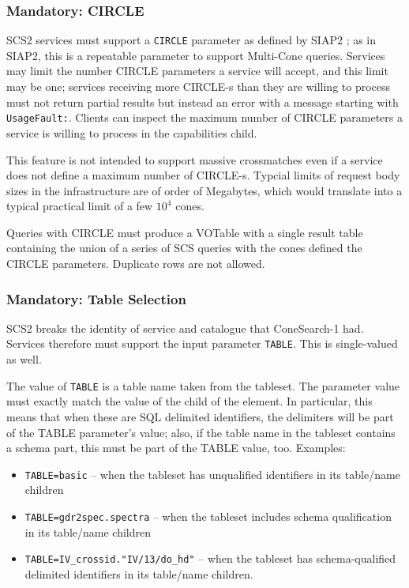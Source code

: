 \documentclass[11pt,a4paper]{ivoa}
\begin{document}
\subsubsection{Mandatory: CIRCLE}

SCS2 services must support a \verb|CIRCLE| parameter as defined by SIAP2
\citep{2015ivoa.spec.1223D}; as in SIAP2, this is a repeatable
parameter to support Multi-Cone queries.  Services may limit
the number CIRCLE parameters a service will
accept, and this limit may be one; services receiving more
CIRCLE-s than they are willing to process must not return partial
results but instead an error with a message starting with
\verb|UsageFault:|.  Clients can inspect the maximum number of CIRCLE
parameters a service is willing to process in the capabilities
 child.

This feature is not intended to support massive crossmatches even if a
service does not define a maximum number of CIRCLE-s.  Typcial limits of
request body sizes in the infrastructure are of order of Megabytes,
which would translate into a typical practical limit of a few $10^4$
cones.

Queries with CIRCLE
must produce a VOTable with a single result table containing the union
of a series of SCS queries with the cones defined the CIRCLE parameters.
Duplicate rows are not allowed.


\subsubsection{Mandatory: Table Selection}

SCS2 breaks the identity of service and catalogue that ConeSearch-1 had.
Services therefore must support the input parameter \verb|TABLE|.  This
is single-valued as well.

The value of \verb|TABLE| is a table name taken from the tableset. The
parameter value must exactly match the value of the  child
of the  element.  In particular, this means that when these
are SQL delimited identifiers, the delimiters will be part of the TABLE
parameter's value; also, if the table name in the tableset contains a
schema part, this must be part of the TABLE value, too.  Examples:

\begin{itemize}
\item \verb|TABLE=basic| -- when the tableset has unqualified
identifiers in its table/name children
\item \verb|TABLE=gdr2spec.spectra| -- when the tableset includes schema
qualification in its table/name children
\item \verb|TABLE=IV_crossid."IV/13/do_hd"| -- when the tableset has
schema-qualified delimited identifiers in its table/name children.
\end{itemize}
\end{document}

